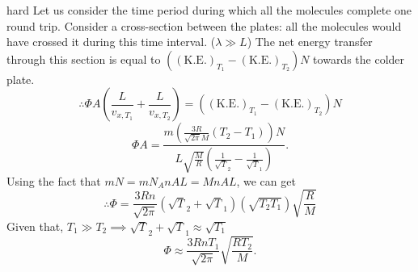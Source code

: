 \begin{solution}{hard}
Let us consider the time period during which all the molecules complete one round trip. 
Consider a cross-section between the plates: all the molecules would have crossed it during this time interval. ($\lambda\gg L$)
The net energy transfer through this section is equal to $((\text{K.E.})_{T_1}-(\text{K.E.})_{T_2})N$ towards the colder plate.
$$\therefore \Phi A\left(\frac{L}{v_{x,T_1}}+\frac{L}{v_{x,T_{2}}}\right)=((\text{K.E.})_{T_1}-(\text{K.E.})_{T_2})N$$
$$\Phi A=\frac{m\left ( \frac{3R}{\sqrt{2\pi}M} (T_2-T_1)\right )N}{L\sqrt{\frac{M}{R}}\left ( \frac{1}{\sqrt T_2} -\frac{1}{\sqrt T_1}\right )}.$$
Using the fact that $mN=mN_A nAL=MnAL$, we can get                      
$$\therefore \Phi =\frac{3Rn}{\sqrt{2\pi}}\left ( \sqrt T_2 +\sqrt T_1\right )(\sqrt{T_2 T_1})\sqrt{\frac{R}{M}}$$
Given that, $T_1\gg T_2 \implies \sqrt T_2 +\sqrt T_1 \approx \sqrt {T_1}$
$$\Phi \approx\boxed{\frac{3RnT_1}{\sqrt{2\pi}}\sqrt{\frac{RT_2}{M}}}.$$
\end{solution}